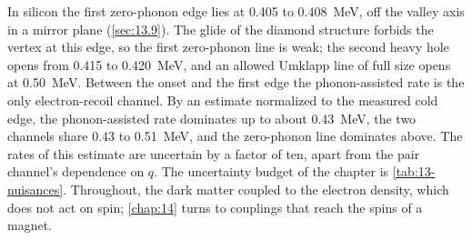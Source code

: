 In silicon the first zero-phonon edge lies at 0.405 to \SI{0.408}{MeV}, off the valley axis in a mirror plane (\cref{sec:13.9}). The glide of the diamond structure forbids the vertex at this edge, so the first zero-phonon line is weak; the second heavy hole opens from 0.415 to \SI{0.420}{MeV}, and an allowed Umklapp line of full size opens at \SI{0.50}{MeV}. Between the onset and the first edge the phonon-assisted rate is the only electron-recoil channel. By an estimate normalized to the measured cold edge, the phonon-assisted rate dominates up to about \SI{0.43}{MeV}, the two channels share 0.43 to \SI{0.51}{MeV}, and the zero-phonon line dominates above. The rates of this estimate are uncertain by a factor of ten, apart from the pair channel's dependence on $q$. The uncertainty budget of the chapter is \cref{tab:13-nuisances}. Throughout, the dark matter coupled to the electron density, which does not act on spin; \cref{chap:14} turns to couplings that reach the spins of a magnet.
